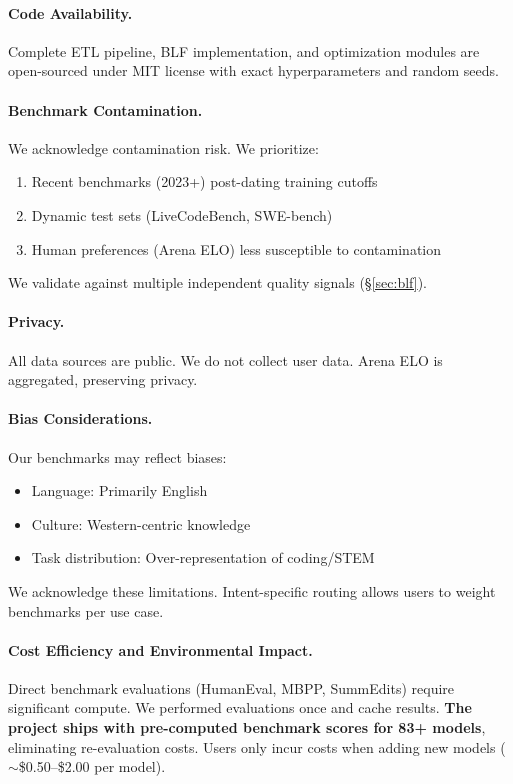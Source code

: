 \paragraph{Code Availability.}
Complete ETL pipeline, BLF implementation, and optimization modules are open-sourced under MIT license with exact hyperparameters and random seeds.

\paragraph{Benchmark Contamination.}
We acknowledge contamination risk. We prioritize:
%
\begin{enumerate}[nosep]
\item Recent benchmarks (2023+) post-dating training cutoffs
\item Dynamic test sets (LiveCodeBench, SWE-bench)
\item Human preferences (Arena ELO) less susceptible to contamination
\end{enumerate}
%
We validate against multiple independent quality signals (§\ref{sec:blf}).

\paragraph{Privacy.}
All data sources are public. We do not collect user data. Arena ELO is aggregated, preserving privacy.

\paragraph{Bias Considerations.}
Our benchmarks may reflect biases:
%
\begin{itemize}[nosep]
\item Language: Primarily English
\item Culture: Western-centric knowledge
\item Task distribution: Over-representation of coding/STEM
\end{itemize}
%
We acknowledge these limitations. Intent-specific routing allows users to weight benchmarks per use case.

\paragraph{Cost Efficiency and Environmental Impact.}
Direct benchmark evaluations (HumanEval, MBPP, SummEdits) require significant compute. We performed evaluations once and cache results. \textbf{The project ships with pre-computed benchmark scores for 83+ models}, eliminating re-evaluation costs. Users only incur costs when adding new models ($\sim$\$0.50--\$2.00 per model).

